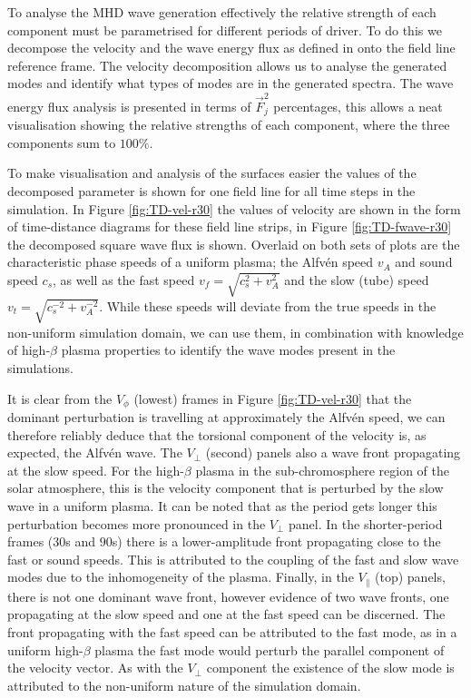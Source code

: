 To analyse the MHD wave generation effectively the relative strength of each component must be parametrised for different periods of driver.
To do this we decompose the velocity and the wave energy flux as defined in \cite{bogdan2003} onto the field line reference frame.
The velocity decomposition allows us to analyse the generated modes and identify what types of modes are in the generated spectra.
The wave energy flux analysis is presented in terms of $\vec{F}^2_j$ percentages, this allows a neat visualisation showing the relative strengths of each component, where the three components sum to $100\%$.


To make visualisation and analysis of the surfaces easier the values of the decomposed parameter is shown for one field line for all time steps in the simulation.
In Figure \ref{fig:TD-vel-r30} the values of velocity are shown in the form of time-distance diagrams for these field line strips, in Figure \ref{fig:TD-fwave-r30} the decomposed square wave flux is shown. Overlaid on both sets of plots are the characteristic phase speeds of a uniform plasma; the Alfv\'en speed $v_A$ and sound speed $c_s$, as well as the fast speed $v_f = \sqrt{c_s^2 + v_A^2}$ and the slow (tube) speed $v_t = \sqrt{c_s^{-2} + v_A^{-2}}$.
While these speeds will deviate from the true speeds in the non-uniform simulation domain, we can use them, in combination with knowledge of high-$\beta$ plasma properties to identify the wave modes present in the simulations.


It is clear from the $V_\phi$ (lowest) frames in Figure \ref{fig:TD-vel-r30} that the dominant perturbation is travelling at approximately the Alfv\'en speed, we can therefore reliably deduce that the torsional component of the velocity is, as expected, the Alfv\'en wave.
The $V_\perp$ (second) panels also a wave front propagating at the slow speed. For the high-$\beta$ plasma in the sub-chromosphere region of the solar atmosphere, this is the velocity component that is perturbed by the slow wave in a uniform plasma. 
It can be noted that as the period gets longer this perturbation becomes more pronounced in the $V_\perp$ panel.
In the shorter-period frames ($30$s and $90$s) there is a lower-amplitude front propagating close to the fast or sound speeds.
This is attributed to the coupling of the fast and slow wave modes due to the inhomogeneity of the plasma.
Finally, in the $V_\parallel$ (top) panels, there is not one dominant wave front, however evidence of two wave fronts, one propagating at the slow speed and one at the fast speed can be discerned.
The front propagating with the fast speed can be attributed to the fast mode, as in a uniform high-$\beta$ plasma the fast mode would perturb the parallel component of the velocity vector.
As with the $V_\perp$ component the existence of the slow mode is attributed to the non-uniform nature of the simulation domain.


